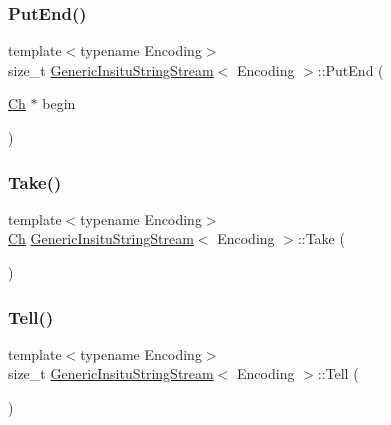 \subsubsection{\texorpdfstring{Put\+End()}{PutEnd()}}
{\footnotesize\ttfamily template$<$typename Encoding$>$ \\
size\+\_\+t \hyperlink{structGenericInsituStringStream}{Generic\+Insitu\+String\+Stream}$<$ Encoding $>$\+::Put\+End (\begin{DoxyParamCaption}\item[{\hyperlink{structGenericInsituStringStream_a277308a58f551f11d0d9a20823702b5a}{Ch} $\ast$}]{begin }\end{DoxyParamCaption})\hspace{0.3cm}{\ttfamily [inline]}}

\mbox{\label{structGenericInsituStringStream_afde4e46663225e4c32cfdbcd261f321e}} 
\subsubsection{\texorpdfstring{Take()}{Take()}}
{\footnotesize\ttfamily template$<$typename Encoding$>$ \\
\hyperlink{structGenericInsituStringStream_a277308a58f551f11d0d9a20823702b5a}{Ch} \hyperlink{structGenericInsituStringStream}{Generic\+Insitu\+String\+Stream}$<$ Encoding $>$\+::Take (\begin{DoxyParamCaption}{ }\end{DoxyParamCaption})\hspace{0.3cm}{\ttfamily [inline]}}

\mbox{\label{structGenericInsituStringStream_aa9a84abb24e8c93b683a2e7bfea309db}} 
\subsubsection{\texorpdfstring{Tell()}{Tell()}}
{\footnotesize\ttfamily template$<$typename Encoding$>$ \\
size\+\_\+t \hyperlink{structGenericInsituStringStream}{Generic\+Insitu\+String\+Stream}$<$ Encoding $>$\+::Tell (\begin{DoxyParamCaption}{ }\end{DoxyParamCaption})\hspace{0.3cm}{\ttfamily [inline]}}



